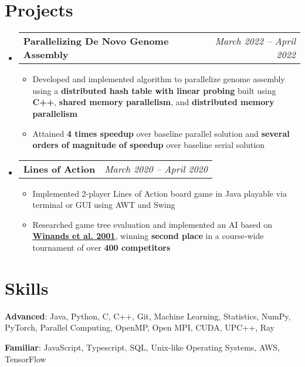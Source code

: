 \documentclass[letterpaper,11pt]{article}
\makeatletter
\newcommand{\ritem}[1]{
  \item\small{
    {#1 \vspace{-2pt}}
  }
}
\newcommand{\resumeProjectHeading}[2]{
  \vspace{-1pt}\item
    \begin{tabular*}{0.97\textwidth}[t]{l@{\extracolsep{\fill}}r}
      \textbf{#1} & \textit{\small #2} \\
    \end{tabular*}\vspace{-5pt}
}
\newcommand{\resumeSubHeadingListStart}{\begin{itemize}[leftmargin=*]}
\newcommand{\resumeSubHeadingListEnd}{\end{itemize}}
\newcommand{\resumeItemListStart}{\begin{itemize}}
\newcommand{\resumeItemListEnd}{\end{itemize}\vspace{-5pt}}
\makeatother
\begin{document}
\section{Projects}
  \resumeSubHeadingListStart
    \resumeProjectHeading{Parallelizing De Novo Genome Assembly}{March 2022 -- April 2022}
      \resumeItemListStart
        \ritem{Developed and implemented algorithm to parallelize genome assembly using a \textbf{distributed hash table with linear probing} built using \textbf{C++}, \textbf{shared memory parallelism}, and \textbf{distributed memory parallelism}}
        \ritem{Attained \textbf{4 times speedup} over baseline parallel solution and \textbf{several orders of magnitude of speedup} over baseline serial solution}
      \resumeItemListEnd
  
    \resumeProjectHeading{Lines of Action}{March 2020 -- April 2020}
      \resumeItemListStart
        \ritem{Implemented 2-player Lines of Action board game in Java playable via terminal or GUI using AWT and Swing}
        \ritem{Researched game tree evaluation and implemented an AI based on \textbf{\underline{\href{http://citeseerx.ist.psu.edu/viewdoc/download?doi=10.1.1.4.3549&rep=rep1&type=pdf}{Winands et al. 2001}}}, winning \textbf{second place} in a course-wide tournament of over \textbf{400 competitors}}
      \resumeItemListEnd
    
  \resumeSubHeadingListEnd


\section{Skills}
    \textbf{Advanced}: Java, Python, C, C++, Git, Machine Learning, Statistics, NumPy, PyTorch, Parallel Computing, OpenMP, Open MPI, CUDA, UPC++, Ray
    
    \textbf{Familiar}: JavaScript, Typescript, SQL, Unix-like Operating Systems, AWS, TensorFlow
\end{document}
